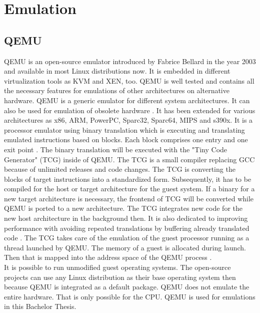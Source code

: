 
\chapter{Emulation}\label{ch:emulation}

\section{QEMU}

QEMU is an open-source emulator introduced by Fabrice Bellard in the year 2003 and available in most Linux distributions now. It is embedded in different virtualization tools as KVM and XEN, too. QEMU is well tested and contains all the necessary features for emulations of other architectures on alternative hardware. 
QEMU is a generic emulator for different system architectures. It can also be used for emulation of obsolete hardware \cite[~p.24]{Opsahl2013}. 
It has been extended for various architectures as x86, ARM, PowerPC, Sparc32, Sparc64, MIPS and s390x.
It is a processor emulator using binary translation \cite{Butt2011} which is executing and translating emulated instructions based on blocks. Each block comprises one entry and one exit point \cite[~p.5]{Wang2010}. 
The binary translation will be executed with the "Tiny Code Generator" (TCG) inside of QEMU. 
The TCG is a small compiler replacing GCC because of unlimited releases and code changes. The TCG is converting the blocks of target instructions into a standardized form. 
Subsequently, it has to be compiled for the host or target architecture for the guest system. 
If a binary for a new target architecture is necessary, the frontend of TCG will be converted while QEMU is ported to a new architecture. 
The TCG integrates new code for the new host architecture in the background then. It is also dedicated to improving performance with avoiding repeated translations by buffering already translated code \cite{Cota2017}. 
The TCG takes care of the emulation of the guest processor running as a thread launched by QEMU. The memory of a guest is allocated during launch. Then that is mapped into the address space of the QEMU process  \cite[~p.29]{Opsahl2013}.\\
It is possible to run unmodified guest operating systems. The open-source projects can use any Linux distribution as their base operating system then because QEMU is integrated as a default package. 
QEMU does not emulate the entire hardware. That is only possible for the CPU. QEMU is used for emulations in this Bachelor Thesis.

